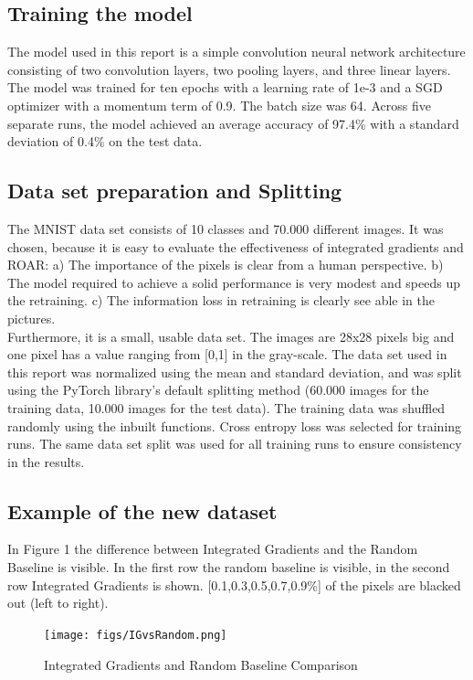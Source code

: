 \documentclass[conference]{IEEEtran}
\begin{document}
\subsection{Training the model}
The model used in this report is a simple convolution neural network architecture consisting of two convolution layers, two pooling layers, and three linear layers. The model was trained for ten epochs with a learning rate of 1e-3 and a SGD optimizer with a momentum term of 0.9. The batch size was 64. Across five separate runs, the model achieved an average accuracy of 97.4\% with a standard deviation of 0.4\% on the test data.

\subsection{Data set preparation and Splitting}\label{AA}

The MNIST data set consists of 10 classes and 70.000 different images. It was chosen, because it is easy to evaluate the effectiveness of integrated gradients and ROAR: a) The importance of the pixels is clear from a human perspective. b) The model required to achieve a solid performance is very modest and speeds up the retraining. c) The information loss in retraining is clearly see able in the pictures.\\ Furthermore, it is a small, usable data set. The images are 28x28 pixels big and one pixel has a value ranging from [0,1] in the gray-scale.
The data set used in this report was normalized using the mean and standard deviation, and was split using the PyTorch library's default splitting method (60.000 images for the training data, 10.000 images for the test data). The training data was shuffled randomly using the inbuilt functions.  Cross entropy loss was selected for training runs. The same data set split was used for all training runs to ensure consistency in the results.


\subsection{Example of the new dataset}

In Figure 1 the difference between Integrated Gradients and the Random Baseline is visible. In the first row the random baseline is visible, in the second row Integrated Gradients is shown. [0.1,0.3,0.5,0.7,0.9\%] of the pixels are blacked out (left to right).

\begin{figure}[h]
	\centering
	\texttt{[image: figs/IGvsRandom.png]}
	\caption{Integrated Gradients and Random Baseline Comparison}
	\label{fig:igvsR}
\end{figure}
\end{document}
